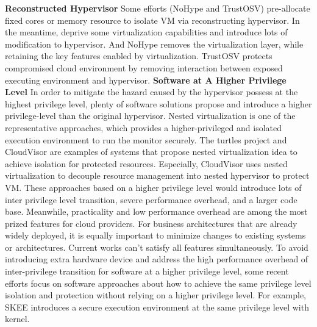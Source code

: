 \documentclass[conference]{IEEEtran}
\begin{document}
\textbf{Reconstructed Hypervisor }
Some efforts (NoHype\cite{NoHype} and TrustOSV\cite{TrustOSV}) pre-allocate fixed cores or memory resource to isolate VM via reconstructing hypervisor. In the meantime, deprive some virtualization capabilities and introduce lots of modification to hypervisor. And NoHype removes the virtualization layer, while retaining the key features enabled by virtualization. TrustOSV protects compromised cloud environment by removing interaction between exposed executing environment and hypervisor.
\textbf{Software at A Higher Privilege Level}
In order to mitigate the hazard caused by the hypervisor possess at the highest privilege level, plenty of software solutions propose and introduce a higher privilege-level than the original hypervisor. Nested virtualization is one of the representative approaches, which provides a higher-privileged and isolated 
execution environment to run the monitor securely. The turtles project \cite{Ben2007The} and CloudVisor \cite{Zhang2011CloudVisor} are examples of systems that propose nested virtualization idea to achieve isolation for protected resources. Especially, CloudVisor uses nested virtualization to decouple 
resource management into nested hypervisor to protect VM. These approaches based on a higher privilege level would introduce lots of inter privilege level transition, severe performance overhead, and a larger code base.
Meanwhile, practicality and low performance overhead are among the most prized features for cloud providers. For business architectures that are already widely deployed, it is equally important to minimize changes to existing systems or architectures. Current works can't satisfy all features simultaneously. To avoid introducing extra hardware device and address the high performance overhead of inter-privilege transition for software at a higher privilege level, some recent efforts focus on software approaches about how to achieve the same privilege level isolation and protection without relying on a higher privilege level. For example, SKEE\cite{Azab2016SKEE} introduces a secure execution environment at the same privilege level with kernel. 
\end{document}
